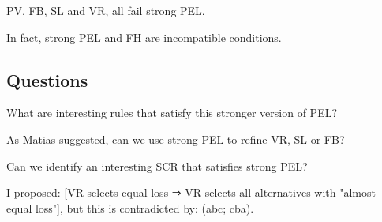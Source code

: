 \documentclass[version=3.21, pagesize, twoside=off, bibliography=totoc, DIV=calc, fontsize=12pt, a4paper]{scrartcl}
\begin{document}
PV, FB, SL and VR, all fail strong PEL. 

In fact, strong PEL and FH are incompatible conditions. 

\subsection{Questions}
What are interesting rules that satisfy this stronger version of PEL? 

As Matias suggested, can we use strong PEL to refine VR, SL or FB?

Can we identify an interesting SCR that satisfies strong PEL?

I proposed: [VR selects equal loss ⇒ VR selects all alternatives with "almost equal loss"], but this is contradicted by: (abc; cba).

%
\end{document}
